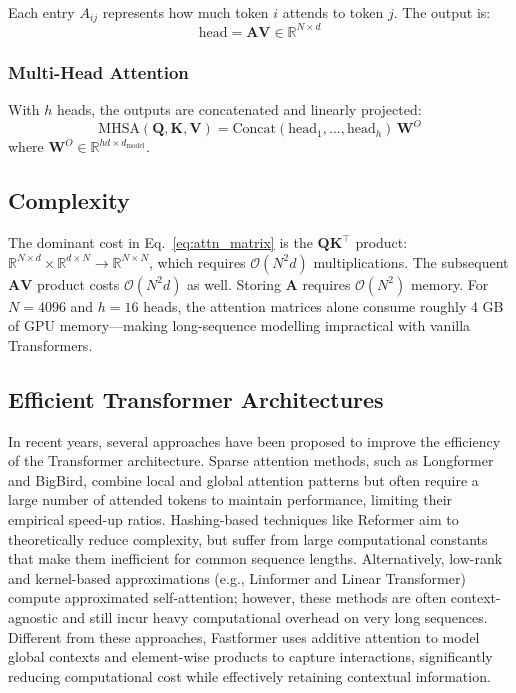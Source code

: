 \documentclass[11pt,a4paper]{article}
\newcommand{\mat}[1]{\mathbf{#1}}
\newcommand{\R}{\mathbb{R}}
\theoremstyle{definition}
\begin{document}
Each entry $A_{ij}$ represents how much token $i$ attends to token $j$.
The output is:
\begin{equation*}
  \text{head} = \mat{A}\mat{V} \in \R^{N\times d}
\end{equation*}

\subsubsection{Multi-Head Attention}

With $h$ heads, the outputs are concatenated and linearly projected:
\begin{equation*}
  \text{MHSA}(\mat{Q},\mat{K},\mat{V}) =
  \text{Concat}(\text{head}_1,\ldots,\text{head}_h)\,\mat{W}^{O}
\end{equation*}
where $\mat{W}^{O}\in\R^{hd\times d_{\text{model}}}$.

\subsection{Complexity}

The dominant cost in Eq.~\ref{eq:attn_matrix} is the $\mat{Q}\mat{K}^{\top}$ product:
$\R^{N\times d}\times\R^{d\times N}\to\R^{N\times N}$, which requires $\mathcal{O}(N^{2}d)$
multiplications.
The subsequent $\mat{A}\mat{V}$ product costs $\mathcal{O}(N^{2}d)$ as well.
Storing $\mat{A}$ requires $\mathcal{O}(N^{2})$ memory.
For $N=4096$ and $h=16$ heads, the attention matrices alone consume roughly 4 GB of GPU
memory---making long-sequence modelling impractical with vanilla Transformers.

\subsection{Efficient Transformer Architectures}

In recent years, several approaches have been proposed to improve the efficiency of the Transformer architecture. Sparse attention methods, such as Longformer and BigBird, combine local and global attention patterns but often require a large number of attended tokens to maintain performance, limiting their empirical speed-up ratios. Hashing-based techniques like Reformer aim to theoretically reduce complexity, but suffer from large computational constants that make them inefficient for common sequence lengths. Alternatively, low-rank and kernel-based approximations (e.g., Linformer and Linear Transformer) compute approximated self-attention; however, these methods are often context-agnostic and still incur heavy computational overhead on very long sequences. Different from these approaches, Fastformer uses additive attention to model global contexts and element-wise products to capture interactions, significantly reducing computational cost while effectively retaining contextual information.
\end{document}
